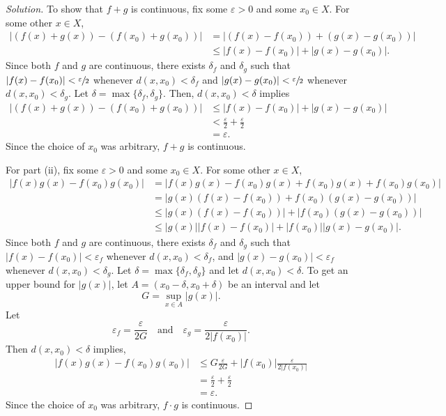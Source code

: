 \documentclass[11pt,letterpaper]{article}
\newcommand{\eps}{\varepsilon}
\renewcommand{\epsilon}{\eps}
\newenvironment{solution}
  {\renewcommand\qedsymbol{}\begin{proof}[Solution]}
  {\end{proof}\bigskip}
\begin{document}
\begin{solution}
	To show that $f+g$ is continuous, fix some $\epsilon > 0$ and some $x_0 \in X$. For some other $x\in X$, 
	\[\begin{split}
		|(f(x) + g(x)) - (f(x_0) + g(x_0))| &=  | (f(x) - f(x_0)) + (g(x) - g(x_0))|\\
		& \leq | f(x) - f(x_0) |+|g(x) - g(x_0)|.
	\end{split}\]
	Since both $f$ and $g$ are continuous, there exists $\delta_f$ and $\delta_g$ such that $|f(x) - f(x_0)| < \sfrac{\epsilon}{2}$ whenever $d(x,x_0) < \delta_f$ and $|g(x) - g(x_0)| < \sfrac{\epsilon}{2}$ whenever $d(x,x_0) < \delta_g$. Let $\delta = \max\{\delta_f, \delta_g\}$. Then, $d(x,x_0) < \delta$ implies 
	\[\begin{split}
		|(f(x) + g(x)) - (f(x_0) + g(x_0))| & \leq | f(x) - f(x_0) |+|g(x) - g(x_0)|\\
		&<\frac{\epsilon}{2} + \frac{\epsilon}{2}\\
		&= \epsilon.
	\end{split}\]
	Since the choice of $x_0$ was arbitrary, $f+g$ is continuous.
	
	For part (ii), fix some $\epsilon > 0$ and some $x_0 \in X$. For some other $x\in X$, 
	\[\begin{split}
		|f(x)g(x) - f(x_0)g(x_0)| &=  |f(x)g(x) - f(x_0)g(x) + f(x_0)g(x) + f(x_0)g(x_0)|\\
		&= |g(x)(f(x) - f(x_0)) + f(x_0)(g(x) - g(x_0))|\\
		&\leq |g(x)(f(x) - f(x_0))| + |f(x_0)(g(x) - g(x_0))|\\
		&\leq |g(x)||f(x) - f(x_0)| + |f(x_0)||g(x) - g(x_0)|.
	\end{split}\]
	Since both $f$ and $g$ are continuous, there exists $\delta_f$ and $\delta_g$ such that $|f(x) - f(x_0)| < \epsilon_f$ whenever $d(x,x_0) < \delta_f$, and $|g(x) - g(x_0)| < \epsilon_f$ whenever $d(x,x_0) < \delta_g$. Let $\delta = \max\{\delta_f, \delta_g\}$ and let $d(x,x_0) < \delta$. To get an upper bound for $|g(x)|$, let $A = (x_0 - \delta, x_0+\delta)$ be an interval and let $$G = \sup_{x \in A}|g(x)|.$$ Let $$\epsilon_f = \frac{\epsilon}{2G} \quad \text{and} \quad \epsilon_g = \frac{\epsilon}{2|f(x_0)|}.$$ Then $d(x,x_0) < \delta$ implies,
	\[\begin{split}
		|f(x)g(x) - f(x_0)g(x_0)| & \leq G\frac{\epsilon}{2G} + |f(x_0)|\frac{\epsilon}{2|f(x_0)|}\\
		& = \frac{\epsilon}{2} + \frac{\epsilon}{2}\\
		&= \epsilon.
	\end{split}\]
	Since the choice of $x_0$ was arbitrary, $f\cdot g$ is continuous.
	

\end{solution}
\end{document}
